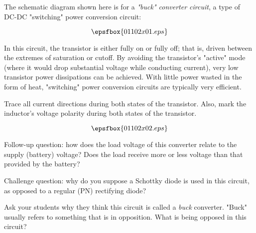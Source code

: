 

The schematic diagram shown here is for a {\it "buck" converter circuit}, a type of DC-DC "switching" power conversion circuit:

$$\epsfbox{01102x01.eps}$$

In this circuit, the transistor is either fully on or fully off; that is, driven between the extremes of saturation or cutoff.  By avoiding the transistor's "active" mode (where it would drop substantial voltage while conducting current), very low transistor power dissipations can be achieved.  With little power wasted in the form of heat, "switching" power conversion circuits are typically very efficient.

Trace all current directions during both states of the transistor.  Also, mark the inductor's voltage polarity during both states of the transistor.







$$\epsfbox{01102x02.eps}$$

\vskip 10pt

Follow-up question: how does the load voltage of this converter relate to the supply (battery) voltage?  Does the load receive more or less voltage than that provided by the battery?

\vskip 10pt

Challenge question: why do you suppose a Schottky diode is used in this circuit, as opposed to a regular (PN) rectifying diode?







Ask your students why they think this circuit is called a {\it buck} converter.  "Buck" usually refers to something that is in opposition.  What is being opposed in this circuit?




